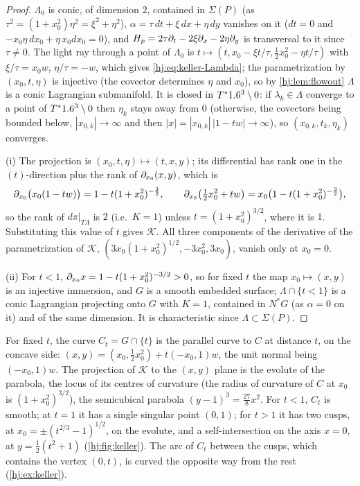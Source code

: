 \begin{proof}
  $\Lambda_0$ is conic, of dimension $2$, contained in $\Sigma(P)$ (as
  $\tau^2=(1+x_0^2)\eta^2=\xi^2+\eta^2$), $\alpha=\tau\,dt+\xi\,dx+\eta\,dy$
  vanishes on it ($dt=0$ and $-x_0\eta\,dx_0+\eta\,x_0dx_0=0$), and $H_p=2\tau\partial_t-
  2\xi\partial_x-2\eta\partial_y$ is transversal to it since $\tau\neq0$.  The light ray
  through a point of $\Lambda_0$ is $t\mapsto(t,x_0-\xi t/\tau,\frac12x_0^2-\eta
  t/\tau)$ with $\xi/\tau=x_0w$, $\eta/\tau=-w$, which gives
  \eqref{hj:eq:keller-Lambda}; the parametrization by $(x_0,t,\eta)$ is
  injective (the covector determines $\eta$ and $x_0$), so by
  \cref{hj:lem:flowout} $\Lambda$ is a conic Lagrangian submanifold.  It is
  closed in $T^*1.6^3\setminus0$: if $\lambda_k\in\Lambda$ converge to a point of
  $T^*1.6^3\setminus0$ then $\eta_k$ stays away from $0$ (otherwise, the covectors
  being bounded below, $|x_{0,k}|\to\infty$ and then
  $|x|=|x_{0,k}|\,|1-tw|\to\infty$), so $(x_{0,k},t_k,\eta_k)$ converges.

  (i) The projection is $(x_0,t,\eta)\mapsto(t,x,y)$; its differential has rank
  one in the $(t)$-direction plus the rank of $\partial_{x_0}(x,y)$, which is
  \begin{equation*}
    \partial_{x_0}\big(x_0(1-tw)\big)=1-t(1+x_0^2)^{-\frac32},\qquad
    \partial_{x_0}\big(\tfrac12x_0^2+tw\big)=x_0\big(1-t(1+x_0^2)^{-\frac32}\big),
  \end{equation*}
  so the rank of $d\pi|_{T\Lambda}$ is $2$ (i.e.\ $K=1$) unless
  $t=(1+x_0^2)^{3/2}$, where it is $1$.  Substituting this value of $t$ gives
  $\mathcal K$.  All three components of the derivative of the parametrization of
  $\mathcal K$, $(3x_0(1+x_0^2)^{1/2},-3x_0^2,3x_0)$, vanish only at $x_0=0$.

  (ii) For $t<1$, $\partial_{x_0}x=1-t(1+x_0^2)^{-3/2}>0$, so for fixed $t$ the map
  $x_0\mapsto(x,y)$ is an injective immersion, and $G$ is a smooth embedded
  surface; $\Lambda\cap\{t<1\}$ is a conic Lagrangian projecting onto $G$ with
  $K=1$, contained in $N^*G$ (as $\alpha=0$ on it) and of the same dimension.
  It is characteristic since $\Lambda\subset\Sigma(P)$.
\end{proof}

For fixed $t$, the curve $C_t=G\cap\{t\}$ is the parallel curve to $C$ at
distance $t$, on the concave side: $(x,y)=(x_0,\frac12x_0^2)+t(-x_0,1)w$, the
unit normal being $(-x_0,1)w$.  The projection of $\mathcal K$ to the $(x,y)$
plane is the evolute of the parabola, the locus of its centres of curvature
(the radius of curvature of $C$ at $x_0$ is $(1+x_0^2)^{3/2}$), the semicubical
parabola $(y-1)^3=\frac{27}8x^2$.  For $t<1$, $C_t$ is smooth; at $t=1$ it has a
single singular point $(0,1)$; for $t>1$ it has two cusps, at
$x_0=\pm(t^{2/3}-1)^{1/2}$, on the evolute, and a self-intersection on the axis
$x=0$, at $y=\frac12(t^2+1)$ (\cref{hj:fig:keller}).  The arc of $C_t$ between the
cusps, which contains the vertex $(0,t)$, is curved the opposite way from the
rest (\cref{hj:ex:keller}).

